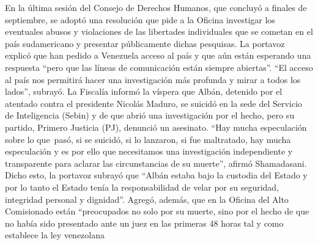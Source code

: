 \documentclass{article}%
\begin{document}
%
En la última sesión del Consejo de Derechos Humanos, que concluyó a finales de septiembre, se adoptó una resolución que pide a la Oficina investigar los eventuales abusos y violaciones de las libertades individuales que se cometan en el país sudamericano y presentar públicamente dichas pesquisas.%
\newline%
%
La portavoz explicó que han pedido a Venezuela acceso al país y que aún están esperando una respuesta “pero que las líneas de comunicación están siempre abiertas”.%
\newline%
%
“El acceso al país nos permitirá hacer una investigación más profunda y mirar a todos los lados”, subrayó.%
\newline%
%
La Fiscalía informó la víspera que Albán, detenido por el atentado contra el presidente Nicolás Maduro, se suicidó en la sede del Servicio de Inteligencia (Sebin) y de que abrió una investigación por el hecho, pero su partido, Primero Justicia (PJ), denunció un asesinato.%
\newline%
%
“Hay mucha especulación sobre lo que~pasó, si se suicidó, si lo lanzaron, si fue maltratado, hay mucha especulación y es por ello que necesitamos una investigación independiente y transparente para aclarar las circunstancias de su muerte”, afirmó Shamadasani.%
\newline%
%
Dicho esto, la portavoz subrayó que “Albán estaba bajo la custodia del Estado y por lo tanto el Estado tenía la responsabilidad de velar por su seguridad, integridad personal y dignidad”.%
\newline%
%
Agregó, además, que en la Oficina del Alto Comisionado están “preocupados no solo por su muerte, sino por el hecho de que no había sido presentado ante un juez en las primeras 48 horas tal y como establece la ley venezolana%
\newline%
%
\end{document}
